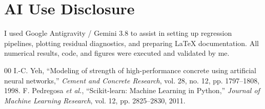 \documentclass[conference,10pt]{IEEEtran}
\begin{document}
\section*{AI Use Disclosure}
I used Google Antigravity / Gemini 3.8 to assist in setting up regression pipelines, plotting residual diagnostics, and preparing LaTeX documentation. All numerical results, code, and figures were executed and validated by me.

\begin{thebibliography}{00}
 I.-C. Yeh, ``Modeling of strength of high-performance concrete using artificial neural networks,'' \textit{Cement and Concrete Research}, vol. 28, no. 12, pp. 1797--1808, 1998.
 F. Pedregosa \textit{et al.}, ``Scikit-learn: Machine Learning in Python,'' \textit{Journal of Machine Learning Research}, vol. 12, pp. 2825--2830, 2011.
\end{thebibliography}
\end{document}
